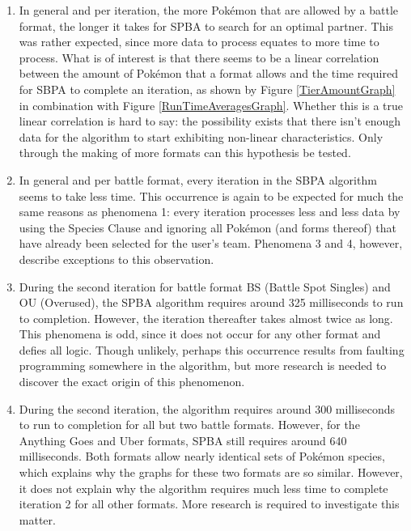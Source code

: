 \documentclass{article}
\begin{document}
\begin{enumerate}
	\item In general and per iteration, the more Pok\'emon that are allowed by a battle format, the longer it takes for SPBA to search for an optimal partner. This was rather expected, since more data to process equates to more time to process. What is of interest is that there seems to be a linear correlation between the amount of Pok\'emon that a format allows and the time required for SBPA to complete an iteration, as shown by Figure \ref{TierAmountGraph} in combination with Figure \ref{RunTimeAveragesGraph}. Whether this is a true linear correlation is hard to say: the possibility exists that there isn't enough data for the algorithm to start exhibiting non-linear characteristics. Only through the making of more formats can this hypothesis be tested.
	\item In general and per battle format, every iteration in the SBPA algorithm seems to take less time. This occurrence is again to be expected for much the same reasons as phenomena 1: every iteration processes less and less data by using the Species Clause and ignoring all Pok\'emon (and forms thereof) that have already been selected for the user's team. Phenomena 3 and 4, however, describe exceptions to this observation.
	\item During the second iteration for battle format BS (Battle Spot Singles) and OU (Overused), the SPBA algorithm requires around 325 milliseconds to run to completion. However, the iteration thereafter takes almost twice as long. This phenomena is odd, since it does not occur for any other format and defies all logic. Though unlikely, perhaps this occurrence results from faulting programming somewhere in the algorithm, but more research is needed to discover the exact origin of this phenomenon.
	\item During the second iteration, the algorithm requires around 300 milliseconds to run to completion for all but two battle formats. However, for the Anything Goes and Uber formats, SPBA still requires around 640 milliseconds. Both formats allow nearly identical sets of  Pok\'emon species, which explains why the graphs for these two formats are so similar. However, it does not explain why the algorithm requires much less time to complete iteration 2 for all other formats. More research is required to investigate this matter.
\end{enumerate}
\end{document}

